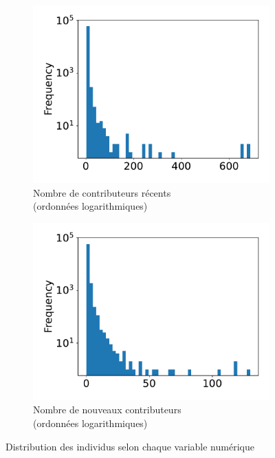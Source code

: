 \begin{figure}
    \begin{subfigure}[t]{0.5\textwidth}
        \includegraphics[width=\textwidth]{experiment/data_analysis/recentContributorCount_distribution}
        \caption{Nombre de contributeurs récents\\(ordonnées logarithmiques)}
    \end{subfigure}%
    \begin{subfigure}[t]{0.5\textwidth}
        \includegraphics[width=\textwidth]{experiment/data_analysis/newContributorCount_distribution}
        \caption{Nombre de nouveaux contributeurs\\(ordonnées logarithmiques)}
    \end{subfigure}

    \caption{Distribution des individus selon chaque variable numérique}
    \label{fig:distribution}
\end{figure}

